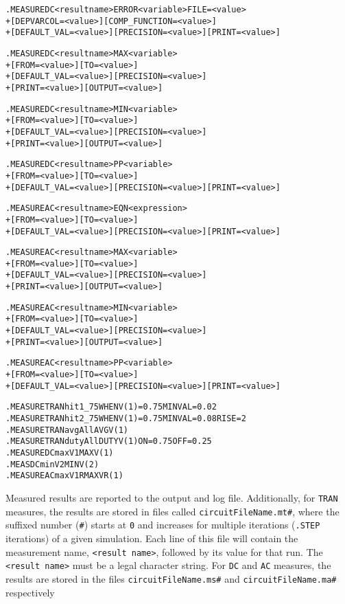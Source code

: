 \begin{Command}
\begin{alltt}
.MEASURE DC <result name> ERROR <variable> FILE=<value>
+ [DEPVARCOL=<value>] [COMP_FUNCTION=<value>]
+ [DEFAULT_VAL=<value>] [PRECISION=<value>] [PRINT=<value>]

.MEASURE DC <result name> MAX <variable>
+ [FROM=<value>] [TO=<value>] 
+ [DEFAULT_VAL=<value>] [PRECISION=<value>] 
+ [PRINT=<value>] [OUTPUT=<value>]

.MEASURE DC <result name> MIN <variable>
+ [FROM=<value>] [TO=<value>] 
+ [DEFAULT_VAL=<value>] [PRECISION=<value>]
+ [PRINT=<value>] [OUTPUT=<value>]

.MEASURE DC <result name> PP <variable>
+ [FROM=<value>] [TO=<value>] 
+ [DEFAULT_VAL=<value>] [PRECISION=<value>] [PRINT=<value>] 

.MEASURE AC <result name> EQN <expression> 
+ [FROM=<value>] [TO=<value>] 
+ [DEFAULT_VAL=<value>] [PRECISION=<value>] [PRINT=<value>]

.MEASURE AC <result name> MAX <variable>
+ [FROM=<value>] [TO=<value>] 
+ [DEFAULT_VAL=<value>] [PRECISION=<value>] 
+ [PRINT=<value>] [OUTPUT=<value>]

.MEASURE AC <result name> MIN <variable>
+ [FROM=<value>] [TO=<value>] 
+ [DEFAULT_VAL=<value>] [PRECISION=<value>]
+ [PRINT=<value>] [OUTPUT=<value>]

.MEASURE AC <result name> PP <variable>
+ [FROM=<value>] [TO=<value>] 
+ [DEFAULT_VAL=<value>] [PRECISION=<value>] [PRINT=<value>]    

\end{alltt}

\examples
\begin{alltt}
.MEASURE TRAN hit1_75 WHEN V(1)=0.75 MINVAL=0.02
.MEASURE TRAN hit2_75 WHEN V(1)=0.75 MINVAL=0.08 RISE=2
.MEASURE TRAN avgAll AVG V(1)
.MEASURE TRAN dutyAll DUTY V(1) ON=0.75 OFF=0.25
.MEASURE DC maxV1 MAX V(1)
.MEAS DC minV2 MIN V(2)
.MEASURE AC maxV1R MAX VR(1)
\end{alltt}

\arguments

\begin{Arguments}

Measured results are reported to the output and log file.  Additionally, for \texttt{TRAN}
measures, the results are stored in files called \texttt{circuitFileName.mt\#}, where
the suffixed number (\texttt{\#}) starts at \texttt{0} and increases for multiple
iterations (\texttt{.STEP} iterations) of a given simulation. Each line of this file
will contain the measurement name, \texttt{<result name>}, followed by its value for
that run.  The \texttt{<result name>} must be a legal \Xyce{} character string.  For
\texttt{DC} and \texttt{AC} measures, the results are stored in the files 
\texttt{circuitFileName.ms\#} and \texttt{circuitFileName.ma\#} respectively


\end{Arguments}
\end{Command}
